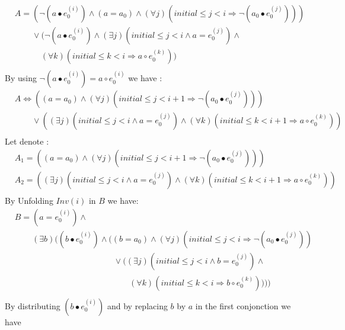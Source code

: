 \documentclass[a4paper,10pt]{article}
\newcommand{\idx}{\ensuremath{i}\xspace}
\newcommand{\idxinitial}{\ensuremath{\mathit{initial}}\xspace}
\newcommand{\at}[1]{{(#1)}}
\newcommand{\impl}{\ensuremath{\Longrightarrow}}
\newcommand{\Inv}[1]{\ensuremath{\mathit{Inv}(#1)\xspace}}
\newenvironment{proof}[1][Proof.]{\begin{trivlist}
\item[\hskip \labelsep {\bfseries #1}]}{\end{trivlist}}
\begin{document}
\begin{proof}
  \begin{align*}
    &A= (\neg (a \bullet e_0^\at{\idx}) \land (a = a_0) \land (\forall j)(\idxinitial \leq j < \idx \impl \neg (a_0 \bullet e_0^\at{j}))) \\
    &\phantom{A=} 
       \lor (\neg (a \bullet e_0^\at{\idx}) \land (\exists j)(\idxinitial \leq j < \idx \land a = e_0^\at{j}) \land\\ 
    &\phantom{A= \lor (} 
       (\forall k)(\idxinitial \leq k < \idx \impl a \circ e_0^\at{k})) \\              
  \end{align*}
  By using $\neg (a \bullet e_0^\at{\idx}) = a \circ e_0^\at{\idx}$ we have :
  \begin{align*}
    &A\Leftrightarrow ((a = a_0) \land (\forall j)(\idxinitial \leq j < \idx+1 \impl \neg (a_0 \bullet e_0^\at{j}))) \\
    &\phantom{A=} 
       \lor ((\exists j)(\idxinitial \leq j < \idx \land a = e_0^\at{j}) \land (\forall k)(\idxinitial \leq k < \idx+1 \impl a \circ e_0^\at{k})) \\           
  \end{align*}
  Let denote :
  \begin{align*}
    &A_1= ((a = a_0) \land (\forall j)(\idxinitial \leq j < \idx+1 \impl \neg (a_0 \bullet e_0^\at{j})))\\
    &A_2= ((\exists j)(\idxinitial \leq j < \idx \land a = e_0^\at{j}) \land (\forall k)(\idxinitial \leq k < \idx+1 \impl a \circ e_0^\at{k}))\\
  \end{align*}
  By Unfolding $\Inv{\idx}$ in $B$ we have:
  \begin{align*}
    &B= (a = e_0^\at{\idx}) \land \\
    &\phantom{B=} 
       (\exists b) ((b \bullet e_0^\at{\idx}) \land ((b = a_0) \land (\forall j)(\idxinitial \leq j < \idx \impl \neg (a_0 \bullet e_0^\at{j})) \\
    &\phantom{B= (a = e_0^\at{\idx}) \land (\exists b) (} 
       \lor ((\exists j)(\idxinitial \leq j < \idx \land b = e_0^\at{j}) \land \\
    &\phantom{B= (a = e_0^\at{\idx}) \land ((b \bullet e_0\at{\idx}} 
       (\forall k)(\idxinitial \leq k < \idx \impl b \circ e_0^\at{k})))) \\
  \end{align*}
  By distributing $(b \bullet e_0^\at{\idx})$ and by replacing $b$ by $a$ in the first conjonction we have

\end{proof}
\end{document}
